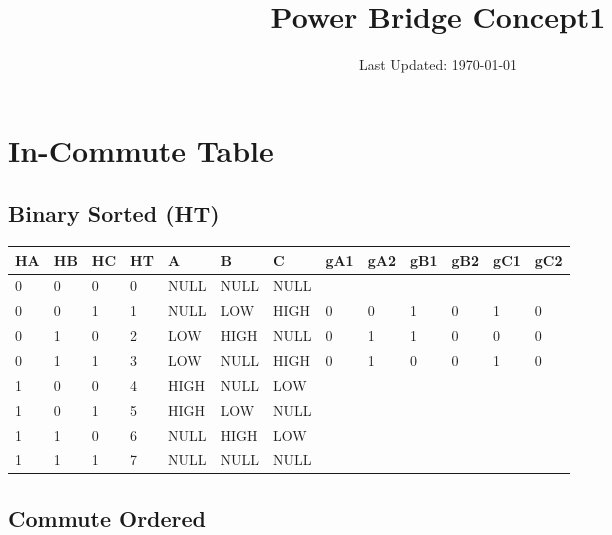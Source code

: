 \documentclass[a4paper]{article}
\title{Power Bridge Concept1}
\date{Last Updated: \today}
\begin{document}
\pagestyle{fancy} \lhead{} \rhead{}
\maketitle

\section{In-Commute Table}
\subsection{Binary Sorted (HT)}
  \small
\begin{tabular}{lllllllllllll}
  \hline
  HA & HB & HC & HT & A & B & C & gA1 & gA2 & gB1 & gB2 & gC1 & gC2\\
  \hline
  0 & 0 & 0 & 0 & NULL & NULL & NULL &  &&&&&\\
  0 & 0 & 1 & 1 & NULL & LOW & HIGH & 0 & 0 & 1 & 0 & 1 & 0 \\
  0 & 1 & 0 & 2 & LOW & HIGH & NULL & 0 & 1 & 1 & 0 & 0 & 0 \\
  0 & 1 & 1 & 3 & LOW & NULL & HIGH & 0 & 1 & 0 & 0 & 1 & 0 \\
  1 & 0 & 0 & 4 & HIGH & NULL & LOW &  &&&&&\\
  1 & 0 & 1 & 5 & HIGH & LOW & NULL & &&&&&\\
  1 & 1 & 0 & 6 & NULL & HIGH & LOW & &&&&&\\
  1 & 1 & 1 & 7 & NULL & NULL & NULL & &&&&&\\
  \hline
\end{tabular}

\subsection{Commute Ordered}
\end{document}
